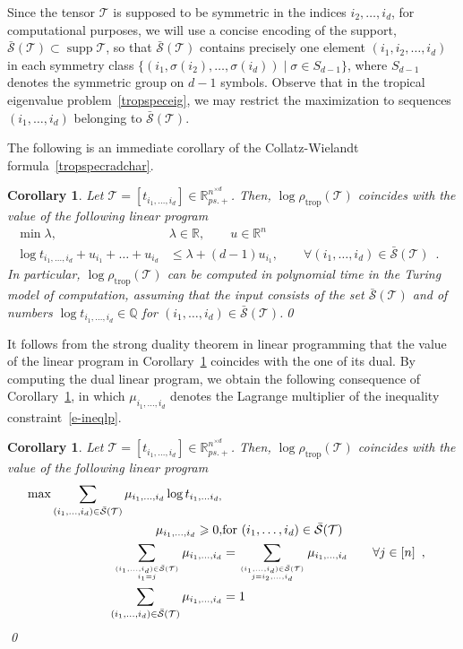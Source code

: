\documentclass{amsart}
\newcommand{\supp}[1]{\operatorname{supp}{#1}}
\newcommand{\support}{\mathcal{S}}
\newcommand{\R}{\mathbb{R}}
\newcommand{\0}{\mathbf{0}}
\newcommand{\1}{\mathbf{1}}
\newcommand{\cT}{\mathcal{T}}
\newcommand{\trop}{\mathrm{trop}}
\newtheorem{corollary}[theo]{Corollary}
\theoremstyle{remark}
\numberwithin{equation}{section} %
\renewcommand{\geq}{\geqslant}
\renewcommand{\leq}{\leqslant}
\begin{document}
%
%
%
%
Since the tensor $\cT$ is supposed to be symmetric in the indices $i_2,\dots,i_d$, 
%
for computational purposes,
we will use
%
%
a concise encoding of the support, $\bar{\support}(\cT)\subset
\supp \cT$, so that $\bar{\support}(\cT)$ contains precisely one
element $(i_1,i_2,\dots,i_d)$ in each symmetry class $\{(i_1,\sigma(i_2),\dots,\sigma(i_d))\mid \sigma\in S_{d-1}\}$, where $S_{d-1}$ denotes the symmetric
group on $d-1$ symbols. 
Observe that in the tropical eigenvalue problem~\eqref{tropspeceig}, we may restrict the maximization to sequences
$(i_1,\dots,i_d)$ belonging to $\bar{\support}(\cT)$.

The following is an immediate corollary of the Collatz-Wielandt formula~\eqref{tropspecradchar}.
%
%
\begin{corollary}\label{cor-lp}
Let $\cT=[t_{i_1,\ldots,i_d}]\in\R_{ps.+}^{n^{\times d}}$.  Then, $\log\rho_{\trop}(\cT)$ coincides
with the value of the following linear program
\begin{eqnarray}
\min \lambda,& \lambda \in \R, \qquad u\in \R^n &\nonumber \\ 
\log t_{i_1,\dots,i_d} + u_{i_1} + \dots +u_{i_d} &\leq \lambda + (d-1) u_{i_1} ,
\qquad \forall (i_1,\dots,i_d) \in \bar{\support}(\cT) \enspace .
\label{e-ineqlp}
\end{eqnarray}
In particular, $\log\rho_{\trop}(\cT)$ can be computed in polynomial time
in the Turing model of computation, assuming that the input consists
of the set $\bar{\support}(\cT)$ and 
of numbers $\log t_{i_1,\dots,i_d} \in \mathbb{Q}$ for $(i_1,\dots,i_d)\in 
\bar{\support}(\cT)$.\hfill\qed
\end{corollary}
It follows from the strong duality theorem in linear programming
that the value of the linear program in Corollary~\ref{cor-lp}
coincides with the one of its dual. By computing the dual linear
program, we obtain the following consequence of Corollary~\ref{cor-lp},
in which $\mu_{i_1,\dots,i_d}$ denotes the Lagrange multiplier
of the inequality constraint~\eqref{e-ineqlp}.
\begin{corollary}\label{cor-lp2}
Let $\cT=[t_{i_1,\ldots,i_d}]\in\R_{ps.+}^{n^{\times d}}$.  Then, $\log\rho_{\trop}(\cT)$ coincides
with the value of the following linear program
\begin{eqnarray*}
\max \sum_{(i_1,\dots,i_d)\in \bar{\support}(\cT)}
\mu_{i_1,\dots,i_d} \log t_{i_1,\dots i_d,} \nonumber\\
\mu_{i_1,\dots,i_d}\geq 0, & \text{for } (i_1,\dots,i_d)\in 
 \bar{\support}(\cT)\nonumber\\
 \sum_{(i_1,\dots,i_d)\in \bar{\support}(\cT)\atop i_1=j} 
 \mu_{i_1,\dots,i_d} &= \displaystyle\sum_{(i_1,\dots,i_d)\in \bar{\support}(\cT)\atop j=i_2,\dots,i_d 
}
 \mu_{i_1,\dots,i_d} 
 \qquad \forall j\in [n]\enspace ,\\
\sum_{(i_1,\dots,i_d)\in \bar{\support}(\cT)}
 \mu_{i_1,\dots,i_d} &=1 
\end{eqnarray*}
\hfill\qed
\end{corollary}
\end{document}
